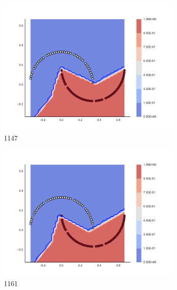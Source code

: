 \begin{figure}[h]
\begin{subfigure}[b]{0.09\textwidth}
    \includegraphics[clip, trim=2.35cm 1.75cm 4.5cm 0cm,width=\textwidth]{img/convergence/1147.pdf}
    \caption{1147}
    \label{fig:convergence_1147}
\end{subfigure}
%
\begin{subfigure}[b]{0.09\textwidth}
    \includegraphics[clip, trim=2.35cm 1.75cm 4.5cm 0cm,width=\textwidth]{img/convergence/1161.pdf}
    \caption{1161}
    \label{fig:convergence_1161}
\end{subfigure}
%
\begin{subfigure}[b]{0.09\textwidth}

\end{subfigure}
\end{figure}
